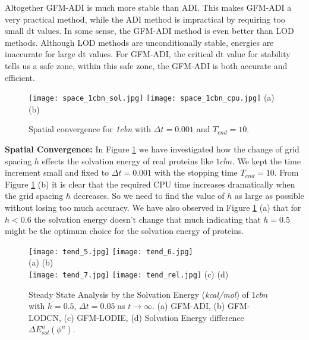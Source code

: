 Altogether GFM-ADI is much more stable than ADI. This makes GFM-ADI a very practical method, while the ADI method is impractical by requiring too small dt values. In some sense, the GFM-ADI method is even better than LOD methods. Although LOD methods are unconditionally stable, energies are inaccurate for large dt values. For GFM-ADI, the critical dt value for stability tells us a safe zone, within this safe zone, the GFM-ADI is both accurate and efficient. 

\begin{figure}[!ht]
	\begin{center}
	\texttt{[image: space\_1cbn\_sol.jpg]}
	\texttt{[image: space\_1cbn\_cpu.jpg]}	
	(a)\hspace*{3in} (b)\\ 
	\end{center}
	\caption{Spatial convergence for \textit{1cbn} with $\Delta t = 0.001$ and $T_{end} = 10$.}
	\label{fig:space_1cbn}
\end{figure}

{\bf Spatial Convergence:} In Figure \ref{fig:space_1cbn} we have investigated how the change of grid spacing $h$ effects the solvation energy of real proteins like $1cbn$. We kept the time increment small and fixed to $ \Delta t = 0.001$ with the stopping time $T_{end} = 10$. From Figure \ref{fig:space_1cbn} (b) it is clear that the required CPU time increases dramatically when the grid spacing $h$ decreases. So we need to find the value of $h$ as large as possible without losing too much accuracy. We have also observed in Figure \ref{fig:space_1cbn} (a) that for $h<0.6$ the solvation energy doesn't change that much indicating that $h = 0.5 $ might be the optimum choice for the solvation energy of proteins. 

\begin{figure}[!h]
	\centering
	\texttt{[image: tend\_5.jpg]}
	\texttt{[image: tend\_6.jpg]}\\
	(a)\hspace*{3in} (b)\\ 
	\texttt{[image: tend\_7.jpg]}
	\texttt{[image: tend\_rel.jpg]}
	(c)\hspace*{3in} (d)
	\caption{Steady State Analysis by the Solvation Energy (\textit{kcal/mol}) of $1cbn$ with $h=0.5$, $\Delta t = 0.05$ as $t\rightarrow \infty$. (a) GFM-ADI, (b) GFM-LODCN, (c) GFM-LODIE, (d) Solvation Energy difference  $\Delta E^n_{sol}(\phi^n)$.}
	\label{fig:tend}
\end{figure}

